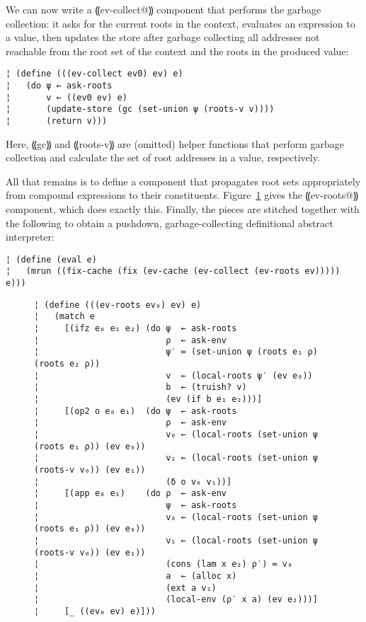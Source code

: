 We can now write a ⸨ev-collect@⸩ component that performs the garbage
collection: it asks for the current roots in the context, evaluates an
expression to a value, then updates the store after garbage collecting
all addresses not reachable from the root set of the context and the
roots in the produced value:
\begin{lstlisting}
¦ (define (((ev-collect ev0) ev) e)
¦   (do ψ ← ask-roots
¦       v ← ((ev0 ev) e)
¦       (update-store (gc (set-union ψ (roots-v v))))
¦       (return v)))
\end{lstlisting}
Here, ⸨gc⸩ and ⸨roots-v⸩ are (omitted) helper functions that perform
garbage collection and calculate the set of root addresses in a value,
respectively.

All that remains is to define a component that propagates root sets
appropriately from compound expressions to their constituents.
Figure~\ref{f:gc-collect-roots} gives the ⸨ev-roots@⸩ component, which
does exactly this.
%
Finally, the pieces are stitched together with the following to obtain
a pushdown, garbage-collecting definitional abstract interpreter:
\begin{lstlisting}
¦ (define (eval e)
¦   (mrun ((fix-cache (fix (ev-cache (ev-collect (ev-roots ev))))) e)))
\end{lstlisting}


\begin{figure} %
\begin{mdframed}
\figskip{}
\begin{lstlisting}
¦ (define (((ev-roots ev₀) ev) e)
¦   (match e
¦     [(ifz e₀ e₁ e₂) (do ψ  ← ask-roots
¦                         ρ  ← ask-env
¦                         ψ′ ≔ (set-union ψ (roots e₁ ρ) (roots e₂ ρ))
¦                         v  ← (local-roots ψ′ (ev e₀))
¦                         b  ← (truish? v)
¦                         (ev (if b e₁ e₂)))]
¦     [(op2 o e₀ e₁)  (do ψ  ← ask-roots
¦                         ρ  ← ask-env
¦                         v₀ ← (local-roots (set-union ψ (roots e₁ ρ)) (ev e₀))
¦                         v₁ ← (local-roots (set-union ψ (roots-v v₀)) (ev e₁))
¦                         (δ o v₀ v₁))]
¦     [(app e₀ e₁)    (do ρ  ← ask-env
¦                         ψ  ← ask-roots
¦                         v₀ ← (local-roots (set-union ψ (roots e₁ ρ)) (ev e₀))
¦                         v₁ ← (local-roots (set-union ψ (roots-v v₀)) (ev e₁))
¦                         (cons (lam x e₂) ρ′) ≔ v₀
¦                         a  ← (alloc x)
¦                         (ext a v₁)
¦                         (local-env (ρ′ x a) (ev e₂)))]
¦     [_ ((ev₀ ev) e)]))
\end{lstlisting}
\label{f:gc-collect-roots}
\end{mdframed}
\end{figure} %




